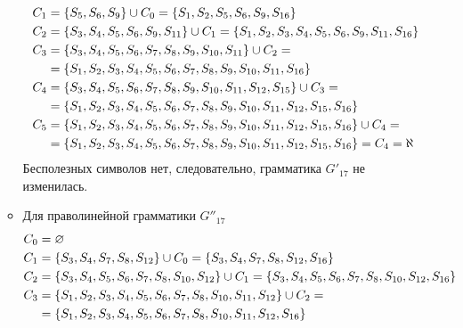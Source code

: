 \begin{enumerate}
\begin{itemize}
\begin{align*}
			            C_{1} & = \left\{S_5, S_6, S_9\right\} \cup C_{0} = \left\{S_1, S_2, S_5, S_6, S_9, S_{16}\right\}                                     \\
			            C_{2} & = \left\{S_3, S_4, S_5, S_6, S_9, S_{11}\right\} \cup C_{1} = \left\{S_1, S_2, S_3, S_4, S_5, S_6, S_9, S_{11}, S_{16}\right\} \\
			            C_{3} & = \left\{S_3, S_4, S_5, S_6, S_7, S_8, S_9, S_{10}, S_{11}\right\} \cup C_{2} =
			            \\ &= \left\{S_1, S_2, S_3, S_4, S_5, S_6, S_7, S_8, S_9, S_{10}, S_{11}, S_{16}\right\}                                      \\
			            C_{4} & = \left\{S_3, S_4, S_5, S_6, S_7, S_8, S_9, S_{10}, S_{11}, S_{12}, S_{15}\right\} \cup C_{3}  =                      \\
			                  & = \left\{S_1, S_2, S_3, S_4, S_5, S_6, S_7, S_8, S_9, S_{10}, S_{11}, S_{12}, S_{15}, S_{16}\right\}                  \\
			            C_{5} & = \left\{S_1, S_2, S_3, S_4, S_5, S_6, S_7, S_8, S_9, S_{10}, S_{11}, S_{12}, S_{15}, S_{16}\right\} \cup C_{4} =     \\
			                  & = \left\{S_1, S_2, S_3, S_4, S_5, S_6, S_7, S_8, S_9, S_{10}, S_{11}, S_{12}, S_{15}, S_{16}\right\} = C_4 = \aleph   \\
		            \end{align*}
		            Бесполезных символов нет, следовательно, грамматика \(G'_{17}\) не изменилась.
		      \item Для праволинейной грамматики \(G''_{17}\)
		            \begin{align*}
			            C_0   & = \varnothing                                                                                                                \\
			            C_{1} & = \cbr{S_3, S_4, S_7, S_8, S_{12}} \cup C_{0} = \cbr{S_3, S_4, S_7, S_8, S_{12}, S_{16}}                                     \\
			            C_{2} & = \cbr{S_3, S_4, S_5, S_6, S_7, S_8, S_{10}, S_{12}} \cup C_{1} = \cbr{S_3, S_4, S_5, S_6, S_7, S_8, S_{10}, S_{12}, S_{16}} \\
			            C_{3} & = \cbr{S_1, S_2, S_3, S_4, S_5, S_6, S_7, S_8, S_{10}, S_{11}, S_{12}} \cup C_{2} =                                          \\
			                  & = \cbr{S_1, S_2, S_3, S_4, S_5, S_6, S_7, S_8, S_{10}, S_{11}, S_{12}, S_{16}}                                               \\

\end{align*}
\end{itemize}
\end{enumerate}
